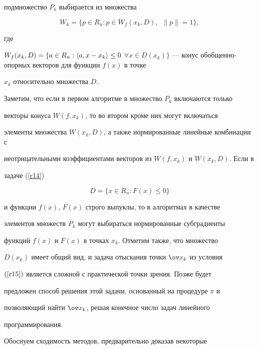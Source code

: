 подмножество $P_k$ выбирается из множества


$$


W_k=\{ p\in R_n: p\in W_f(x_k,D),\ \; \|p\|=1\},


$$


где


$W_f(x_k,D)=\{a\in R_n: \la a, x-x_k \ra \le 0$ $\forall x\in


D(x_k)\}$ --- конус обобщенно-опорных векторов для функции $f(x)$ в точке


$x_k$ относительно множества $D$.





Заметим, что если в первом алгоритме в множество $P_k$ включаются только


векторы конуса $W(f, x_k)$, то во втором кроме них могут включаться


элементы множества $W(x_k, D)$, а также нормированные линейные комбинации с


неотрицательными коэффициентами векторов из $W(f,x_k)$ и $W(x_k,D)$. Если в


задаче (\ref{r14})




\begin{equation} \label{r17}


D= \{x\in R_n: F(x)\le 0\}


\end{equation}


%


и функции $f(x)$, $F(x)$ строго выпуклы, то в алгоритмах в качестве


элементов множеств $P_k$ могут выбираться нормированные субградиенты


функций $f(x)$ и $F(x)$ в точках $x_k$. Отметим также, что множество


$D(x_k)$ имеет общий вид, и задача отыскания точки $\ov x_k$ из условия


$(\ref{r15})$ является сложной с практической точки зрения. Позже будет


предложен способ решения этой задачи, основанный на процедуре $\pi$ и


позволяющий найти $\ov x_k$, решая конечное число задач линейного


программирования.





Обоснуем сходимость методов, предварительно доказав некоторые


